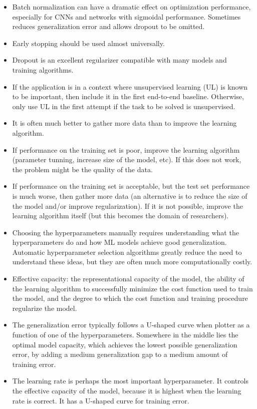 \documentclass{article}
\begin{document}
\begin{itemize}
\item Batch normalization can have a dramatic effect on optimization performance, especially for CNNs and networks with sigmoidal performance. Sometimes reduces generalization error and allows dropout to be omitted.
\item Early stopping should be used almost universally.
\item Dropout is an excellent regularizer compatible with many models and training algorithms.
\item If the application is in a context where unsupervised learning (UL) is known to be important, then include it in the first end-to-end baseline. Otherwise, only use UL in the first attempt if the task to be solved is unsupervised.
\item It is often much better to gather more data than to improve the learning algorithm.
\item If performance on the training set is poor, improve the learning algorithm (parameter tunning, increase size of the model, etc). If this does not work, the problem might be the quality of the data.
\item If performance on the training set is acceptable, but the test set performance is much worse, then gather more data (an alternative is to reduce the size of the model and/or improve regularization). If it is not possible, improve the learning algorithm itself (but this becomes the domain of researchers).
\item Choosing the hyperparameters manually requires understanding what the hyperparameters do and how ML models achieve good generalization. Automatic hyperparameter selection algorithms greatly reduce the need to understand these ideas, but they are often much more computationally costly.
\item Effective capacity: the representational capacity of the model, the ability of the learning algorithm to successfully minimize the cost function used to train the model, and the degree to which the cost function and training procedure regularize the model.
\item The generalization error typically follows a U-shaped curve when plotter as a function of one of the hyperparameters. Somewhere in the middle lies the optimal model capacity, which achieves the lowest possible generalization error, by adding a medium generalization gap to a medium amount of training error.
\item The learning rate is perhaps the most important hyperparameter. It controls the effective capacity of the model, because it is highest when the learning rate is correct. It has a U-shaped curve for training error.

\end{itemize}
\end{document}
